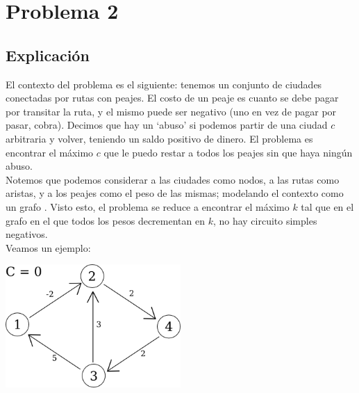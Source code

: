 
\section{Problema 2}

\subsection{Explicación}

El contexto del problema es el siguiente: tenemos un conjunto de ciudades conectadas por rutas con peajes. El costo de un peaje es cuanto se debe pagar por transitar la ruta, y el mismo puede ser negativo (uno en vez de pagar por pasar, cobra). Decimos que hay un `abuso' si podemos partir de una ciudad $c$ arbitraria y volver, teniendo un saldo positivo de dinero. El problema es encontrar el máximo $c$ que le puedo restar a todos los peajes sin que haya ningún abuso. \\

Notemos que podemos considerar a las ciudades como nodos, a las rutas como aristas, y a los peajes como el peso de las mismas; modelando el contexto como un grafo . Visto esto, el problema se reduce a encontrar el máximo $k$ tal que en el grafo en el que todos los pesos decrementan en $k$, no hay circuito simples negativos. \\

Veamos un ejemplo:

{\centering
  \includegraphics[width=0.50\textwidth]{imagenes/problema2/prob2_caso3.png} \\
}
$ $\newline

